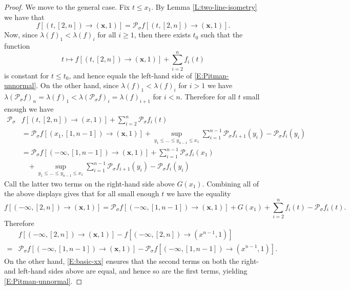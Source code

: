\documentclass[11pt]{article}
\newcommand{\sig}{\sigma}
\newcommand{\la}{\lambda}
\newcommand{\cP}{\mathcal{P}}
\newcommand{\bx}{\mathbf{x}}
\theoremstyle{definition} %
\theoremstyle{remark} %
\begin{document}
\begin{proof}
We move to the general case. Fix $t\le x_1$. By Lemma \ref{L:two-line-isometry} we have that
	$$
	f[(t, [2, n])\to (\bx,1)]=	\cP_\sig f[(t, [2, n])\to (\bx,1)].
	$$
Now, since $\la(f)_1 < \la(f)_i$ for all $i \ge 1$, then there exists $t_0$ such that the function
$$
t \mapsto f[(t, [2, n])\to (\bx,1)] + \sum_{i=2}^n f_i(t)
$$
is constant for $t \le t_0$, and hence equals the left-hand side of \eqref{E:Pitman-unnormal}.
On the other hand, since $\la(f)_1 < \la(f)_i$ for $i > 1$ we have $\la(\cP_{\sig} f)_n = \la(f)_1 < \la(\cP_{\sig} f)_i = \la(f)_{i+1}$ for $i < n$. Therefore for all $t$ small enough we have
\begin{align*}
\cP_{\sig} &f[(t, [2, n])\to (x,1)] + \sum_{i=2}^n \cP_{\sig} f_i(t) \\
&= \cP_{\sig} f[(x_1, [1, n-1])\to (\bx,1)] + \sup_{y_1 \le \dots \le y_{n-1} \le x_1} \sum_{i=1}^{n-1} \cP_\sig f_{i+1}(y_i) - \cP_\sig f_{i}(y_i) \\
&= \cP_{\sig} f[(-\infty, [1, n-1])\to (\bx,1)] + \sum_{i=1}^{n-1} \cP_\sig f_i(x_1) \\&\;\;\;+ \sup_{y_1 \le \dots \le y_{n-1} \le x_1} \sum_{i=1}^{n-1} \cP_\sig f_{i+1}(y_i) - \cP_\sig f_{i}(y_i)
\end{align*}
Call the latter two terms on the right-hand side above $G(x_1)$.
Combining all of the above displays gives that for all small enough $t$ we have the equality
$$
f[(-\infty, [2, n])\to (\bx,1)]= \cP_{\sig} f[(-\infty,[1, n-1])\to (\bx,1)] + G(x_1) + \sum_{i=2}^n f_i(t) - \cP_\sig f_i(t).
$$
Therefore 
\begin{align*}
&f[(-\infty, [2, n])\to (\bx,1)] - f[(-\infty, [2, n])\to (x^{n-1},1)] \\
= &\cP_{\sig} f[(-\infty,[1, n-1])\to (\bx,1)] - \cP_{\sig} f[(-\infty,[1, n-1])\to (x^{n-1},1)].
\end{align*}
On the other hand, \eqref{E:basic-xx} ensures that the second terms on both the right- and left-hand sides above are equal, and hence so are the first terms, yielding \eqref{E:Pitman-unnormal}.
\end{proof}
\end{document}

